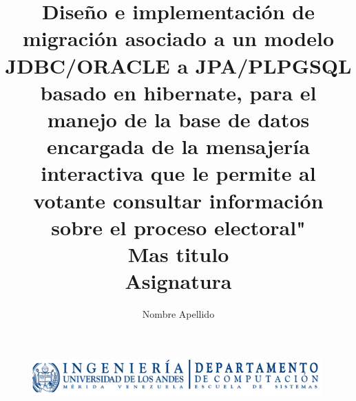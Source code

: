 \documentclass[spanish]{article}
\title{Diseño e implementación de migración asociado a un modelo JDBC/ORACLE a JPA/PLPGSQL basado en hibernate, para el manejo de la base de datos encargada de la mensajería interactiva que le permite al votante consultar información sobre el proceso electoral"\\ Mas titulo \\ Asignatura}
\author{Nombre Apellido}
\begin{document}
\begin{figure}
  \centering
    \includegraphics[width=0.99\textwidth]{Logo_computacion}
\end{figure}

\maketitle
\end{document}
